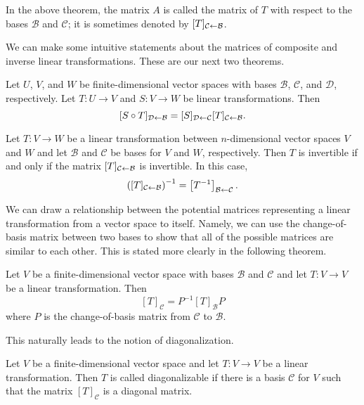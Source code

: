 \documentclass[../m73main.tex]{subfiles}
\begin{document}
In the above theorem, the matrix $A$ is called the matrix of $T$ with respect to the bases $\mathcal{B}$ and $\mathcal{C}$; it is sometimes denoted by $[T]_{\mathcal{C} \leftarrow \mathcal{B}}$.

We can make some intuitive statements about the matrices of composite and inverse linear transformations.
These are our next two theorems.

\begin{theorem}
	Let $U$, $V$, and $W$ be finite-dimensional vector spaces with bases $\mathcal{B}$, $\mathcal{C}$, and $\mathcal{D}$, respectively.
	Let $T : U \to V$ and $S : V \to W$ be linear transformations.
	Then
	\[ [S \circ T]_{\mathcal{D} \leftarrow \mathcal{B}} = [S]_{\mathcal{D} \leftarrow \mathcal{C}} [T]_{\mathcal{C} \leftarrow \mathcal{B}}. \]
\end{theorem}

\begin{theorem}
	Let $T : V \to W$ be a linear transformation between $n$-dimensional vector spaces $V$ and $W$ and let $\mathcal{B}$ and $\mathcal{C}$ be bases for $V$ and $W$, respectively.
	Then $T$ is invertible if and only if the matrix $[T]_{\mathcal{C} \leftarrow \mathcal{B}}$ is invertible.
	In this case,
	\[ \left( [T]_{\mathcal{C} \leftarrow \mathcal{B}} \right)^{-1} = \left[ T^{-1} \right]_{\mathcal{B} \leftarrow \mathcal{C}}. \]
\end{theorem}

We can draw a relationship between the potential matrices representing a linear transformation from a vector space to itself.
Namely, we can use the change-of-basis matrix between two bases to show that all of the possible matrices are similar to each other.
This is stated more clearly in the following theorem.

\begin{theorem}
	Let $V$ be a finite-dimensional vector space with bases $\mathcal{B}$ and $\mathcal{C}$ and let $T : V \to V$ be a linear transformation.
	Then
	\[ [T]_{\mathcal{C}} = P^{-1}[T]_{\mathcal{B}}P \]
	where $P$ is the change-of-basis matrix from $\mathcal{C}$ to $\mathcal{B}$.
\end{theorem}

This naturally leads to the notion of diagonalization.

\begin{definition}
	Let $V$ be a finite-dimensional vector space and let $T : V \to V$ be a linear transformation.
	Then $T$ is called diagonalizable if there is a basis $\mathcal{C}$ for $V$ such that the matrix $[T]_{\mathcal{C}}$ is a diagonal matrix.
\end{definition}
\end{document}

